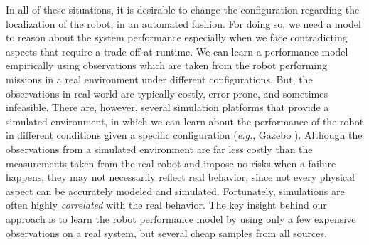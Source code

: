 In all of these situations, it is desirable to change the configuration regarding the localization of the robot, in an automated fashion. For doing so, we need a model to reason about the system performance especially when we face contradicting aspects that require a trade-off at runtime. %
We can learn a performance model empirically using observations which are taken from the robot performing missions in a real environment under different configurations. But, the observations in real-world are typically costly, error-prone, and sometimes infeasible. There are, however, several simulation platforms that provide a simulated environment, in which we can learn about the performance of the robot in different conditions given a specific configuration (\emph{e.g.}, Gazebo \cite{reckhaus2010overview}). Although the observations from a simulated environment are far less costly than the measurements taken from the real robot and impose no risks when a failure happens, they may not necessarily reflect real behavior, since not every physical aspect can be accurately modeled and simulated. Fortunately, simulations are often highly \emph{correlated} with the real behavior. The key insight behind our approach is to learn the robot performance model by using only a few expensive observations on a real system, but several cheap samples from all sources. %


